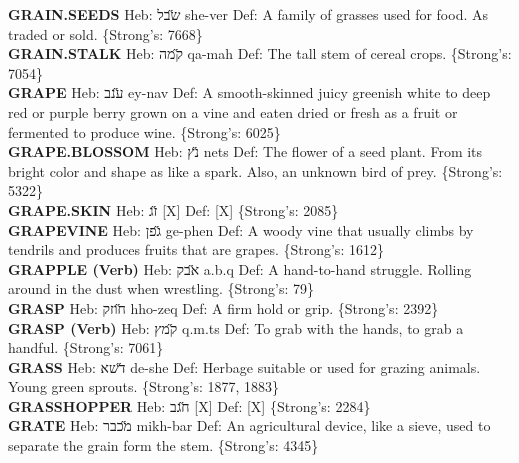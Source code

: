 {\textbf{GRAIN.SEEDS} Heb: {\large\H שבל} she-ver Def: A family of grasses used for food. As traded or sold. \{Strong's: 7668\}\hfill{}\\

\textbf{GRAIN.STALK} Heb: {\large\H קמה} qa-mah Def: The tall stem of cereal crops. \{Strong's: 7054\}\hfill{}\\

\textbf{GRAPE} Heb: {\large\H ענב} ey-nav Def: A smooth-skinned juicy greenish white to deep red or purple berry grown on a vine and eaten dried or fresh as a fruit or fermented to produce wine. \{Strong's: 6025\}\hfill{}\\

\textbf{GRAPE.BLOSSOM} Heb: {\large\H נץ} nets Def: The flower of a seed plant. From its bright color and shape as like a spark. Also, an unknown bird of prey. \{Strong's: 5322\}\hfill{}\\

\textbf{GRAPE.SKIN} Heb: {\large\H זג} {[}X{]} Def: {[}X{]} \{Strong's: 2085\}\hfill{}\\

\textbf{GRAPEVINE} Heb: {\large\H גפן} ge-phen Def: A woody vine that usually climbs by tendrils and produces fruits that are grapes. \{Strong's: 1612\}\hfill{}\\

\textbf{GRAPPLE (Verb)} Heb: {\large\H אבק} a.b.q Def: A hand-to-hand struggle. Rolling around in the dust when wrestling. \{Strong's: 79\}\hfill{}\\

\textbf{GRASP} Heb: {\large\H חוזק} hho-zeq Def: A firm hold or grip. \{Strong's: 2392\}\hfill{}\\

\textbf{GRASP (Verb)} Heb: {\large\H קמץ} q.m.ts Def: To grab with the hands, to grab a handful. \{Strong's: 7061\}\hfill{}\\

\textbf{GRASS} Heb: {\large\H דשא} de-she Def: Herbage suitable or used for grazing animals. Young green sprouts. \{Strong's: 1877, 1883\}\hfill{}\\

\textbf{GRASSHOPPER} Heb: {\large\H חגב} {[}X{]} Def: {[}X{]} \{Strong's: 2284\}\hfill{}\\

\textbf{GRATE} Heb: {\large\H מכבר} mikh-bar Def: An agricultural device, like a sieve, used to separate the grain form the stem. \{Strong's: 4345\}\hfill{}\\

}
